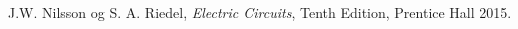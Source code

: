 {}
\begin{thebibliography}{99}
  J.W. Nilsson og S. A. Riedel,
  \emph{Electric Circuits},
  Tenth Edition, Prentice Hall
  2015.
  
  
\end{thebibliography}